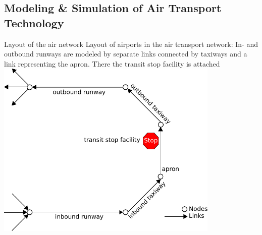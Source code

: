 \subsection{Modeling \& Simulation of Air Transport Technology}
\label{sec:modeling-of-technology}
%
%
%
\createfigure%
{Layout of the air network}%
{Layout of airports in the air transport network: In- and outbound runways are modeled by separate links connected by taxiways and a link representing the apron. There the transit stop facility is attached}%
{\label{fig:air_airport}}%
{\includegraphics[width=0.8\textwidth]{scenarios/figures/sf_flight_model_airport.pdf}}%
